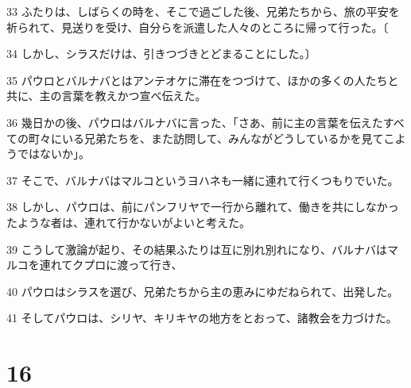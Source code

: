 \par 33 ふたりは、しばらくの時を、そこで過ごした後、兄弟たちから、旅の平安を祈られて、見送りを受け、自分らを派遣した人々のところに帰って行った。〔
\par 34 しかし、シラスだけは、引きつづきとどまることにした。〕
\par 35 パウロとバルナバとはアンテオケに滞在をつづけて、ほかの多くの人たちと共に、主の言葉を教えかつ宣べ伝えた。
\par 36 幾日かの後、パウロはバルナバに言った、「さあ、前に主の言葉を伝えたすべての町々にいる兄弟たちを、また訪問して、みんながどうしているかを見てこようではないか」。
\par 37 そこで、バルナバはマルコというヨハネも一緒に連れて行くつもりでいた。
\par 38 しかし、パウロは、前にパンフリヤで一行から離れて、働きを共にしなかったような者は、連れて行かないがよいと考えた。
\par 39 こうして激論が起り、その結果ふたりは互に別れ別れになり、バルナバはマルコを連れてクプロに渡って行き、
\par 40 パウロはシラスを選び、兄弟たちから主の恵みにゆだねられて、出発した。
\par 41 そしてパウロは、シリヤ、キリキヤの地方をとおって、諸教会を力づけた。

\chapter{16}

